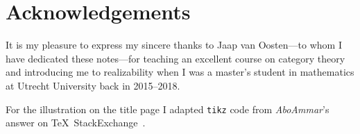 \chapter{Acknowledgements}

It is my pleasure to express my sincere thanks to Jaap van Oosten---to whom I
have dedicated these notes---for teaching an excellent course on category
theory~\cite{vanOosten2016} and introducing me to realizability when I was a
master's student in mathematics at Utrecht University back in 2015--2018.

For the illustration on the title page I adapted \verb|tikz| code from
\emph{AboAmmar}'s answer on \TeX\ StackExchange~\cite{latex-triangle}.

